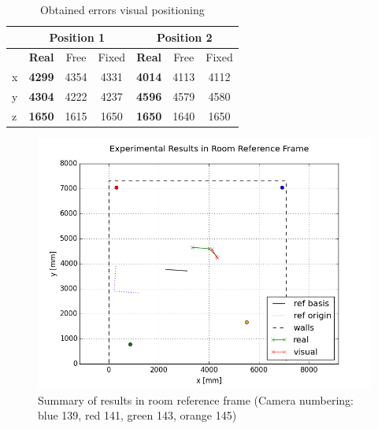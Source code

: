 \begin{table}[H]
\begin{center}
\caption{Obtained errors visual positioning}
\begin{tabular}{lcccccc}
\toprule
    & \multicolumn{3}{c}{\textbf{Position 1}} & \multicolumn{3}{c}{\textbf{Position 2}} \\
\midrule
& \textbf{Real} & Free & Fixed & \textbf{Real} & Free & Fixed \\
x   & \textbf{4299} & 4354 & 4331 & \textbf{4014} & 4113 & 4112  \\
y   & \textbf{4304} & 4222 & 4237 & \textbf{4596} & 4579 & 4580 \\
z   & \textbf{1650} & 1615 & 1650 & \textbf{1650} & 1640 & 1650 \\
\bottomrule
\end{tabular}
\label{tab:res2_errors}
\end{center}
\end{table}

\begin{figure}[H]
    \centering
    \includegraphics[width=\linewidth]{files/res2_room.png}
    \caption{Summary of results in room reference frame (Camera numbering: blue 139, red 141, green 143, orange 145)}
    \label{fig:res2_room}
\end{figure}




